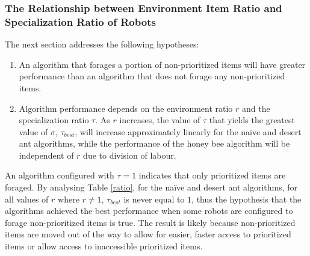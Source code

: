 \subsubsection{The Relationship between Environment Item Ratio and Specialization Ratio of Robots}
\label{relationship}

The next section addresses the following hypotheses:
\begin{enumerate}
\item An algorithm that forages a portion of non-prioritized items will have greater performance than an algorithm that does not forage any non-prioritized items.
\item Algorithm performance depends on the environment ratio $r$ and the specialization ratio $\tau$. As $r$ increases, the value of $\tau$ that yields the greatest value of $\sigma$, $\tau_{best}$, will increase approximately linearly for the na\"ive and desert ant algorithms, while the performance of the honey bee algorithm will be independent of $r$ due to division of labour.
\end{enumerate}

An algorithm configured with $\tau=1$ indicates that only prioritized items are foraged. By analysing Table \ref{ratio}, for the na\"ive and desert ant algorithms, for all values of $r$ where $r \neq 1$, $\tau_{best}$ is never equal to $1$, thus the hypothesis that the algorithms achieved the best performance when some robots are configured to forage non-prioritized items is true. The result is likely because non-prioritized items are moved out of the way to allow for easier, faster access to prioritized items or allow access to inaccessible prioritized items.


